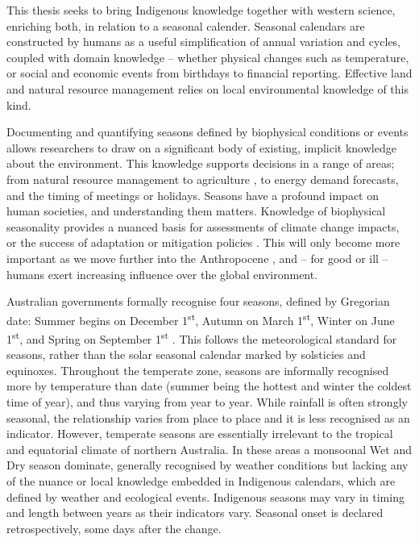 This thesis seeks to bring Indigenous knowledge together with
western science, enriching both, in relation to a seasonal calender.
Seasonal calendars are constructed by humans as a useful simplification of
annual variation and cycles, coupled with domain knowledge -- whether
physical changes such as temperature, or social and economic events from birthdays to
financial reporting.  Effective land and natural resource management relies on
local environmental knowledge of this kind.

Documenting and quantifying seasons defined by biophysical conditions
or events allows researchers to draw on a significant body of existing,
implicit knowledge about the environment.
%
This knowledge supports decisions in a range of areas; from natural
resource management to agriculture \citep{woodward2012a,ens2012}, to
energy demand forecasts, and the timing of meetings or holidays.
Seasons have a profound impact on human societies, and understanding
them matters.  Knowledge of biophysical seasonality provides a nuanced
basis for assessments of climate change impacts, or the success of
adaptation or mitigation policies \citep{green2010a,stevenson1996,prober2011}.
This will only become more important as we move further into the Anthropocene
\citep{steffen2007}, and -- for good or ill -- humans exert increasing
influence over the global environment.


Australian governments formally recognise four seasons, defined by Gregorian date:
Summer begins on December 1\textsuperscript{st}, Autumn on March
1\textsuperscript{st}, Winter on June 1\textsuperscript{st}, and Spring
on September 1\textsuperscript{st} \citep{wells2013}. This follows the
meteorological standard for seasons, rather
than the solar seasonal calendar marked by solsticies and equinoxes.
%
Throughout the temperate zone, seasons are informally recognised more by
temperature than date (summer being the hottest and winter the coldest time
of year), and thus varying from year to year.  While rainfall is often
strongly seasonal, the relationship varies from place to place and it is
less recognised as an indicator.
%
However, temperate seasons are essentially irrelevant to the tropical and
equatorial climate of northern Australia.  In these areas a monsoonal Wet
and Dry season dominate, generally recognised by weather conditions \citep[eg.][]{kingsley2003,willmett2009}
but lacking any of the nuance or local knowledge embedded in Indigenous
calendars, which are defined by weather and ecological events.  Indigenous
seasons may vary in timing and length between years as their indicators vary.
Seasonal onset is declared retrospectively, some days after the change.


